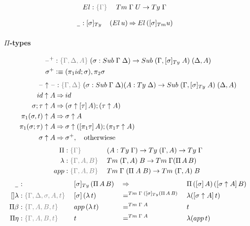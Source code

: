 \documentclass[a4paper,UKenglish,numberwithinsect,cleveref,thm-restate]{lipics-v2021}
\begin{document}
\begin{alignat*}{5}
  \El       & : \implicit{\Gamma}\; && \Tm\;\Gamma\;U \to \Ty\;\Gamma
\end{alignat*}

\begin{alignat*}{5}
  \nameless & : [ \sigma ]_{\Ty}\,  && (\El\, u) \reduce \El\,([\sigma]_{\Tm}{u})
\end{alignat*}

\paragraph*{$\Pi$-types}
\begin{alignat*}{5}
  \blank^+ & : \implicit{\Gamma, \Delta, A}\; (\sigma : \Sub\;\Gamma\;\Delta) \to \Sub\;(\Gamma, [\sigma]_{\Ty}\;A)\;(\Delta, A) \\
  \sigma^+ & \defeq (\pi_1\idS; \sigma), \pi_2\sigma
\end{alignat*}
\begin{alignat*}{5}
  \blank\uparrow\blank & : \implicit{\Gamma, \Delta}\;(\sigma : \Sub\;\Gamma\;\Delta) (A : \Ty\;\Delta) \to \Sub\;(\Gamma, [\sigma]_{\Ty}\;A)\;(\Delta, A) \\
\idS                \uparrow A  & \reduce \idS \\
\sigma ; \tau       \uparrow A  & \reduce (\sigma \uparrow \sub{\tau}{A} ) ; (\tau \uparrow A) \\
\pi_1(\sigma, t)    \uparrow A  & \reduce \sigma \uparrow A \\
\pi_1(\sigma; \tau) \uparrow A  & \reduce \sigma \uparrow (\sub{\pi_1 \tau}{A}) ; (\pi_1 \tau \uparrow A) \\
\sigma              \uparrow A  & \reduce \sigma^+,\quad  \text{otherwiese}
\end{alignat*}
\begin{alignat*}{5}
  \Pi             & : \implicit{\Gamma}\; && (A : \Ty\;\Gamma) \to \Ty\;(\Gamma, A) \to \Ty\;\Gamma \\
  \lambda         &: \implicit{\Gamma, A, B} \; && \Tm\;(\Gamma, A)\;B \to \Tm\;\Gamma(\Pi\,A\,B) \\
  \mathsf{app}    &: \implicit{\Gamma, A, B} \; && \Tm\;\Gamma\;(\Pi\;A\;B) \to \Tm\;(\Gamma, A)\;B
\end{alignat*}
\begin{alignat*}{5}
  \nameless       &: && [ \sigma ]_{\Ty}\, (\Pi\,A\,B) && {} \reduce {} && \Pi\,(\sub{\sigma}{A})\,(\sub{\sigma\uparrow A}{B}) \\
  []\lambda       & : \implicit{\Gamma, \Delta, \sigma, A, t}\;&& [ \sigma ] \,(\lambda\,t) && {} =^{\Tm\;\Gamma\;([\sigma]_{\Ty}(\Pi\,A\,B)} {} && \lambda ([\sigma \uparrow A ]\,t)\\
  \Pi\beta        & : \implicit{\Gamma, A, B, t}\; && \mathsf{app}\,(\lambda\,t)            && =^{\Tm\;\Gamma\;A} && t \\
  \Pi\eta         & : \implicit{\Gamma, A, B, t}\; && t                                     && =^{\Tm\;\Gamma\;A} && \lambda(\mathsf{app}\,t)
\end{alignat*}
\end{document}

